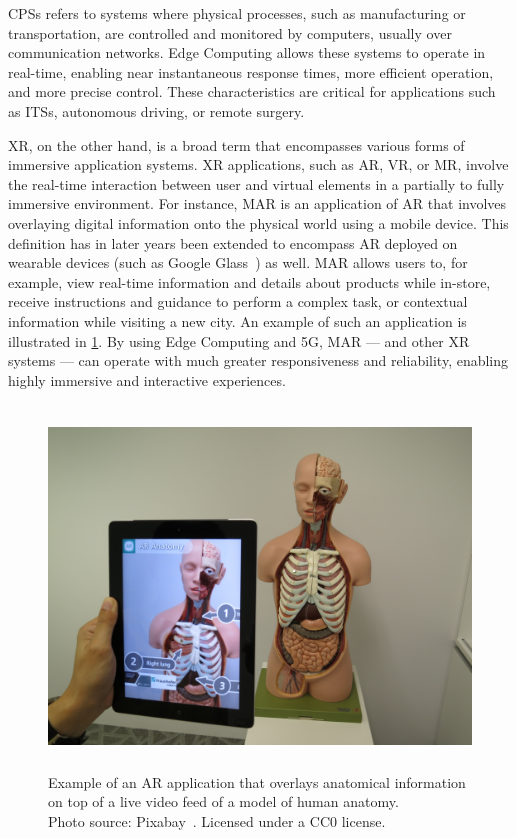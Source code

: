 \glspl{CPS} refers to systems where physical processes, such as manufacturing or transportation, are controlled  and monitored by computers, usually over communication networks.
Edge Computing allows these systems to operate in real-time, enabling near instantaneous response times, more efficient operation, and more precise control.
These characteristics are critical for applications such as \glspl{ITS}, autonomous driving, or remote surgery.

\gls{XR}, on the other hand, is a broad term that encompasses various forms of immersive application systems.
\gls{XR} applications, such as \gls{AR}, \gls{VR}, or \gls{MR}, involve the real-time interaction between user and virtual elements in a partially to fully immersive environment.
For instance, \gls{MAR} is an application of \gls{AR} that involves overlaying digital information onto the physical world using a mobile device.
This definition has in later years been extended to encompass \gls{AR} deployed on wearable devices (such as Google Glass~\cite{googleglass}) as well.
\gls{MAR} allows users to, for example, view real-time information and details about products while in-store, receive instructions and guidance to perform a complex task, or contextual information while visiting a new city.
An  example of such an application is illustrated in \cref{fig:augmentedreality}.
By using Edge Computing and 5G, \gls{MAR} --- and other \gls{XR} systems --- can operate with much greater responsiveness and reliability, enabling highly immersive and interactive experiences.

\begin{figure}
    \centering
    \includegraphics[height=26em]{figures/AR}
    \caption[{ }]{
        Example of an \gls{AR} application that overlays anatomical information on top of a live video feed of a model of human anatomy.\\
    
        {
            \footnotesize%
            Photo source: Pixabay~\cite{picture:AR}.
            Licensed under a \gls{CC0} license.
        }
    }\label{fig:augmentedreality}
\end{figure}

